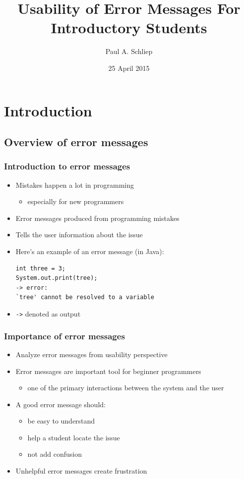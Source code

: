 \documentclass{beamer}
\title[Usability of Error Messages for Introductory Students]{Usability of Error Messages For \\ Introductory Students}
\author[Schliep]{Paul A. Schliep}
\institute[U of Minn, Morris]
{
  Division of Science and Mathematics \\
  University of Minnesota, Morris \\
}
\date[April '15] %
{25 April 2015}
\begin{document}
\begin{frame}
  \titlepage
\end{frame}


\section*{Introduction}

\subsection*{Overview of error messages}

\begin{frame}[fragile]
  \frametitle{Introduction to error messages}
  \begin{itemize}
  	\item Mistakes happen a lot in programming
  	\begin{itemize}
  		\item especially for new programmers
  	\end{itemize}
  	\item Error messages produced from programming mistakes
  	\item Tells the user information about the issue
  	\item Here's an example of an error message (in Java):
  	  \begin{verbatim}
int three = 3;
System.out.print(tree);
-> error: 
`tree' cannot be resolved to a variable
  	\end{verbatim}
  	\item \texttt{->} denoted as output
  \end{itemize}
\end{frame}

\begin{frame}
  \frametitle{Importance of error messages}
  \begin{itemize}
    \item Analyze error messages from usability perspective
  	\item Error messages are important tool for beginner programmers
  	\begin{itemize}
  		\item one of the primary interactions between the system and the user
  	\end{itemize}
  	\item A good error message should:
  	\begin{itemize}
  		\item be easy to understand
  		\item help a student locate the issue
  		\item not add confusion
  	\end{itemize}
  	\item Unhelpful error messages create frustration
  \end{itemize}
\end{frame}
\end{document}
